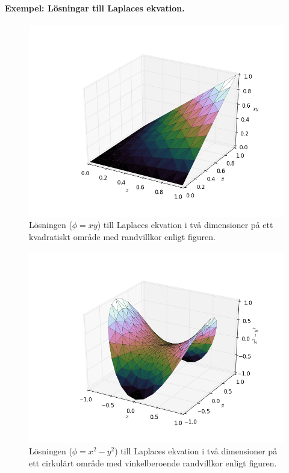\documentclass[%
oneside,                 %
final,                   %
10pt]{article}
\begin{document}
\paragraph{Exempel: Lösningar till Laplaces ekvation.}
\begin{figure}[!ht]  %
  \centerline{\includegraphics[width=0.8\linewidth]{fig/xy.png}}
  \caption{
  Lösningen ($\phi = xy$) till Laplaces ekvation i två dimensioner på ett kvadratiskt område med randvillkor enligt figuren. \label{fig:xy}
  }
\end{figure}



\begin{figure}[!ht]  %
  \centerline{\includegraphics[width=0.8\linewidth]{fig/x2y2.png}}
  \caption{
  Lösningen ($\phi = x^2 - y^2$) till Laplaces ekvation i två dimensioner på ett cirkulärt område med vinkelberoende randvillkor enligt figuren. \label{fig:x2y2}
  }
\end{figure}
\end{document}
